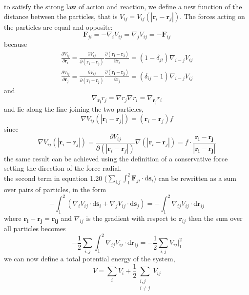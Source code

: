 \documentclass[]{article}
\numberwithin{equation}{section}
\begin{document}
to satisfy the strong law of action and reaction, we define a new function of the distance between the particles, that is $V_{ij}=V_{ij}(|\mathbf r_i-\mathbf r_j|)$.
The forces acting on the particles are equal and opposite:
\begin{equation}\mathbf F_{ji}=-\nabla_iV_{ij}=\nabla_jV_{ij}=-\mathbf F_{ij}\end{equation}
because 
\begin{align*}
	\frac{\partial V_{ij}}{\partial \mathbf r_i}=\frac{\partial V_{ij}}{\partial\mathbf{(r_i-r_j)}}\frac{\partial\mathbf{(r_i-r_j)}}{\partial \mathbf r_i}=(1-\delta_{ji})\nabla_{i-j}V_{ij}\\
	\frac{\partial V_{ij}}{\partial \mathbf r_j}=\frac{\partial V_{ij}}{\partial\mathbf{(r_i-r_j)}}\frac{\partial\mathbf{(r_i-r_j)}}{\partial \mathbf r_j}=(\delta_{ij}-1)\nabla_{i-j}V_{ij}
\end{align*}
and
$$\nabla_\mathbf{r_i}r_j=\nabla r_j\nabla r_i=\nabla_{\mathbf r_j}r_i$$
and lie along the line joining the two particles,
\begin{equation}\nabla V_{ij}(|\mathbf r_i-\mathbf r_j|)=(\mathbf r_i-\mathbf r_j)f\end{equation}
since 
$$\nabla V_{ij}(|\mathbf r_i-\mathbf r_j|)=\frac{\partial V_{ij}}{\partial (|\mathbf r_i-\mathbf r_j|)}\nabla(|\mathbf r_i-\mathbf r_j|)=f\cdot\frac{\mathbf{r_i-r_j}}{|\mathbf{r_i-r_j}|}$$
the same result can be achieved using the definition of a conservative force setting the direction of the force radial.\\

the second term in equation 1.20 ($\sum_{i.j}\int^2_1\mathbf F_{ji}\cdot\mathrm d\mathbf s_i$) can be rewritten as a sum over pairs of particles, in the form 
$$-\int^2_1(\nabla_iV_{ij}\cdot\mathrm d\mathbf s_i+\nabla_jV_{ij}\cdot\mathrm d\mathbf s_j)=-\int^2_1\nabla_{ij}V_{ij}\cdot\mathrm d\mathbf r_{ij}$$
where $\mathbf{r_i-r_j=r_{ij}}$ and $\nabla_{ij}$ is the gradient with respect to $\mathbf r_{ij}$
then the sum over all particles becomes
$$-\frac 12\sum_{i,j}\int^2_1\nabla_{ij}V_{ij}\cdot\mathrm d\mathbf r_{ij}=-\frac 12\sum_{i,j}V_{ij}\Bigr\rvert^2_1$$
we can now define a total potential energy of the system,
\begin{equation}\boxed{V=\sum_iV_i+\frac 12\sum_{\substack{i,j\\i\ne j}}V_{ij}}\end{equation}
\end{document}
